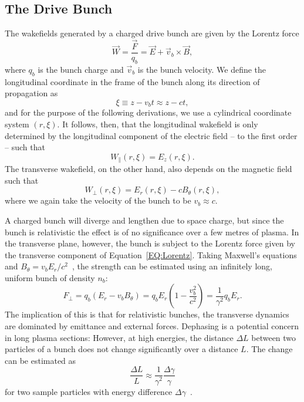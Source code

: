\subsection{The Drive Bunch}
\label{Int:BPI:Drive}

The wakefields generated by a charged drive bunch are given by the Lorentz force
\begin{equation}
    \vec{W} = \frac{\vec{F}}{q_{b}} = \vec{E} + \vec{v}_{b} \times \vec{B}, \label{EQ:Lorentz}
\end{equation}
where $q_{b}$ is the bunch charge and $\vec{v}_{b}$ is the bunch velocity.
We define the longitudinal coordinate in the frame of the bunch along its direction of propagation as
\begin{equation}
    \xi \equiv z - v_{b}t \approx z - ct, \label{EQ:Xi}
\end{equation}
and for the purpose of the following derivations, we use a cylindrical coordinate system $(r, \xi)$.
It follows, then, that the longitudinal wakefield is only determined by the longitudinal component of the electric field -- to the first order -- such that
\begin{equation}
    W_{\parallel}(r,\xi) = E_{z}(r,\xi). \label{EQ:Wz}
\end{equation}
The transverse wakefield, on the other hand, also depends on the magnetic field such that
\begin{equation}
    W_{\perp}(r,\xi) = E_{r}(r,\xi) - cB_{\theta}(r,\xi), \label{EQ:Wr}
\end{equation}
where we again take the velocity of the bunch to be $v_{b} \approx c$.

A charged bunch will diverge and lengthen due to space charge, but since the bunch is relativistic the effect is of no significance over a few metres of plasma.
In the transverse plane, however, the bunch is subject to the Lorentz force given by the transverse component of Equation~\ref{EQ:Lorentz}.
Taking Maxwell's equations and $B_{\theta} = v_{b}E_{r}/c^{2}$~\cite{schindl:1999}, the strength can be estimated using an infinitely long, uniform bunch of density $n_{b}$:
\begin{equation}
    F_{\perp} = q_{b}(E_{r} - v_{b}B_{\theta})
              = q_{b}E_{r}\left(1 - \frac{v_{b}^{2}}{c^{2}}\right)
              = \frac{1}{\gamma^2}q_{b}E_{r}. \label{EQ:DeFocR}
\end{equation}
The implication of this is that for relativistic bunches, the transverse dynamics are dominated by emittance and external forces.
Dephasing is a potential concern in long plasma sections:
However, at high energies, the distance $\Delta L$ between two particles of a bunch does not change significantly over a distance $L$.
The change can be estimated as
\begin{equation}
    \frac{\Delta L}{L} \approx \frac{1}{\gamma^{2}}\frac{\Delta\gamma}{\gamma} \label{EQ:DePhL}
\end{equation}
for two sample particles with energy difference $\Delta\gamma$~\cite{muggli:2017}.

